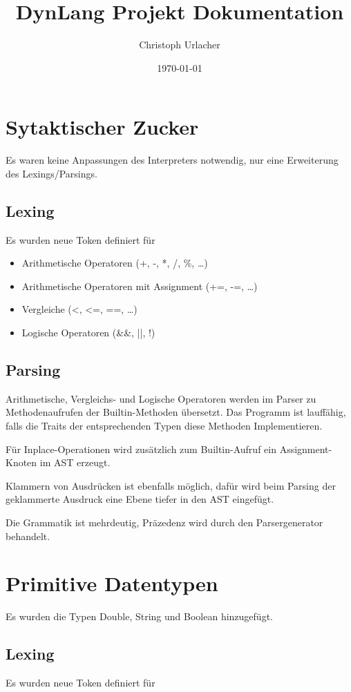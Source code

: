 \documentclass[12pt,a4paper,ngerman,parskip=full]{scrartcl}
\author{Christoph Urlacher}
\date{\today}
\title{DynLang Projekt Dokumentation}
\begin{document}
\maketitle

\section{Sytaktischer Zucker}
\label{sec:org90f987c}
Es waren keine Anpassungen des Interpreters notwendig, nur eine Erweiterung des Lexings/Parsings.

\subsection{Lexing}
\label{sec:org8349833}
Es wurden neue Token definiert für

\begin{itemize}
\item Arithmetische Operatoren (+, -, *, /, \%, \ldots{})
\item Arithmetische Operatoren mit Assignment (+=, -=, \ldots{})
\item Vergleiche (<, <=, ==, \ldots{})
\item Logische Operatoren (\&\&, ||, !)
\end{itemize}

\subsection{Parsing}
\label{sec:orga2826bd}
Arithmetische, Vergleichs- und Logische Operatoren werden im Parser zu Methodenaufrufen der Builtin-Methoden übersetzt.
Das Programm ist lauffähig, falls die Traits der entsprechenden Typen diese Methoden Implementieren.

Für Inplace-Operationen wird zusätzlich zum Builtin-Aufruf ein Assignment-Knoten im AST erzeugt.

Klammern von Ausdrücken ist ebenfalls möglich, dafür wird beim Parsing der geklammerte Ausdruck eine Ebene tiefer in den AST eingefügt.

Die Grammatik ist mehrdeutig, Präzedenz wird durch den Parsergenerator behandelt.

\section{Primitive Datentypen}
\label{sec:org550fd12}
Es wurden die Typen Double, String und Boolean hinzugefügt.

\subsection{Lexing}
\label{sec:org1181424}
Es wurden neue Token definiert für
\end{document}
